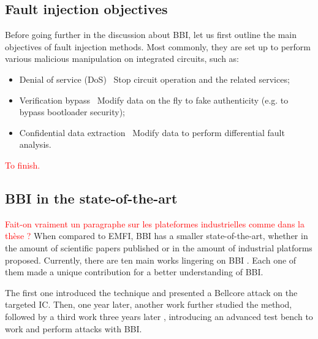 


	\subsection{Fault injection objectives}
		Before going further in the discussion about BBI, let us first outline the main objectives of fault injection methods.
		Most commonly, they are set up to perform various malicious manipulation on integrated circuits, such as:
		\begin{itemize}
			\item Denial of service (DoS) \textrightarrow\ Stop circuit operation and the related services;
			\item Verification bypass \textrightarrow\ Modify data on the fly to fake authenticity (e.g. to bypass bootloader security);
			\item Confidential data extraction \textrightarrow\ Modify data to perform differential fault analysis.
		\end{itemize}
		\textcolor{red}{To finish.}

	\subsection{BBI in the state-of-the-art}
	\textcolor{red}{Fait-on vraiment un paragraphe sur les plateformes industrielles comme dans la thèse ?}
		When compared to EMFI, BBI has a smaller state-of-the-art, whether in the amount of scientific papers published or in the amount of industrial platforms proposed.
		Currently, there are ten main works lingering on BBI \cite{bbiOrigin, bbiSecond, bbiThird, bbiColin,japbbi, japbbi2, mybbiCosade, mybbiFdtc2022, mybbifdtc2023, colinFdtc2023}.
		Each one of them made a unique contribution for a better understanding of BBI.

		The first one \cite{bbiOrigin} introduced the technique and presented a Bellcore attack on the targeted IC.
		Then, one year later, another work \cite{bbiSecond} further studied the method, followed by a third work three years later \cite{bbiThird}, introducing an advanced test bench to work and perform attacks with BBI.

